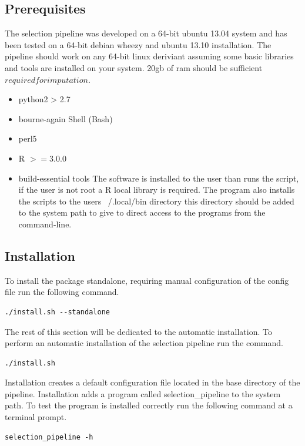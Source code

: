 \documentclass[a4paper,10pt]{article}
\begin{document}
\subsection{Prerequisites}
The selection pipeline was developed on a 64-bit ubuntu 13.04 system and has been tested on a 64-bit debian wheezy and ubuntu 13.10 installation. The pipeline should work on any 64-bit linux deriviant assuming some basic libraries and tools are installed on your system. 20gb of ram should be sufficient \(required for imputation\).
\begin{itemize}
\item python2 > 2.7 
\item bourne-again Shell (Bash)
\item perl5
\item R \( >= 3.0.0 \)
\item build-essential tools 
The software is installed to the user than runs the script, if the user is not root a R local library is required. The program also installs the scripts to the users ~/.local/bin directory this directory should be added to the system path to give to direct access to the programs from the command-line.  

\end{itemize}
\subsection{Installation}
To install the package standalone, requiring manual configuration of the config file run the following command.\\

\begin{verbatim}
./install.sh --standalone
\end{verbatim}

The rest of this section will be dedicated to the automatic installation. To perform an automatic installation of the selection pipeline run the command.\\
\begin{verbatim}
./install.sh
\end{verbatim}

Installation creates a default configuration file located in the base directory of the pipeline. Installation adds a program called selection\_pipeline to the system path. To test the program is installed correctly run the following command at a terminal prompt.

\begin{verbatim}
selection_pipeline -h
\end{verbatim}
\end{document}

